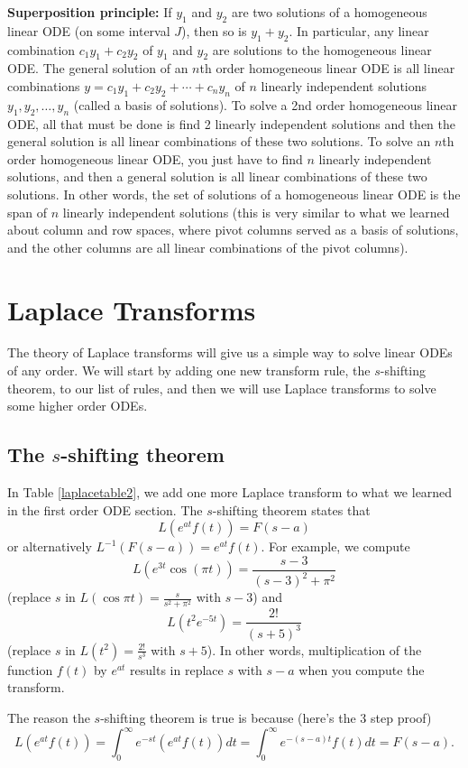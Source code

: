 {\bf Superposition principle:} If $y_1$ and $y_2$ are two solutions of a homogeneous linear ODE (on some interval $J$), then so is $y_1+y_2$. In particular, any linear combination $c_1y_1+c_2y_2$ of $y_1$ and $y_2$ are solutions to the homogeneous linear ODE. The general solution of an $n$th order homogeneous linear ODE is all linear combinations $y=c_1y_1+c_2y_2+\cdots+c_n y_n$ of $n$ linearly independent solutions $y_1, y_2,\ldots,y_n$ (called a basis of solutions). To solve a 2nd order homogeneous linear ODE, all that must be done is find 2 linearly independent solutions and then the general solution is all linear combinations of these two solutions. To solve an $n$th order homogeneous linear ODE, you just have to find $n$ linearly independent solutions, and then a general solution is all linear combinations of these two solutions.  In other words, the set of solutions of a homogeneous linear ODE is the span of $n$ linearly independent solutions (this is very similar to what we learned about column and row spaces, where pivot columns served as a basis of solutions, and the other columns are all linear combinations of the pivot columns). 



\section{Laplace Transforms}
The theory of Laplace transforms will give us a simple way to solve linear ODEs of any order. We will start by adding one new transform rule, the $s$-shifting theorem, to our list of rules, and then we will use Laplace transforms to solve some higher order ODEs.
\subsection{The $s$-shifting theorem}

In Table \ref{laplacetable2}, we add one more Laplace transform to what we learned in the first order ODE section.
The $s$-shifting theorem states that $$L(e^{at}f(t))=F(s-a)$$ or alternatively $L^{-1}(F(s-a)) = e^{at}f(t)$. For example,
we compute $$L(e^{3t}\cos(\pi t)) = \frac{s-3}{(s-3)^2+\pi^2}$$ (replace $s$ in $L(\cos \pi t)=\frac{s}{s^2+\pi^2}$ with $s-3$) and $$L(t^2e^{-5t}) = \frac{2!}{(s+5)^3}$$ (replace $s$ in $L(t^2)=\frac{2!}{s^3}$ with $s+5$). In other words, multiplication of the function $f(t)$ by $e^{at}$ results in replace $s$ with $s-a$ when you compute the transform. 

The reason the $s$-shifting theorem is true is because (here's the 3 step proof) $$ L(e^{at}f(t)) = \int_0^\infty e^{-st}(e^{at}f(t))dt = \int_0^\infty e^{-(s-a)t}f(t)dt = F(s-a).$$ 


